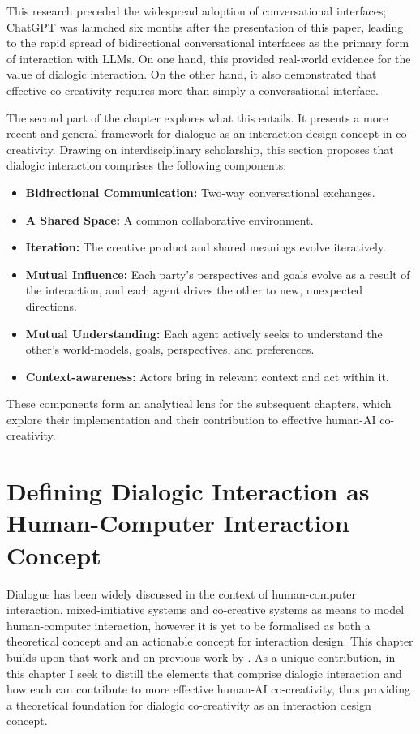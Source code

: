This research preceded the widespread adoption of conversational interfaces; ChatGPT was launched six months after the presentation of this paper, leading to the rapid spread of bidirectional conversational interfaces as the primary form of interaction with LLMs. On one hand, this provided real-world evidence for the value of dialogic interaction. On the other hand, it also demonstrated that effective co-creativity requires more than simply a conversational interface.

The second part of the chapter explores what this entails. It presents a more recent and general framework for dialogue as an interaction design concept in co-creativity. Drawing on interdisciplinary scholarship, this section proposes that dialogic interaction comprises the following components:

\begin{itemize}
\item \textbf{Bidirectional Communication:} Two-way conversational exchanges.
\item \textbf{A Shared Space:} A common collaborative environment.
\item \textbf{Iteration:} The creative product and shared meanings evolve iteratively.
\item \textbf{Mutual Influence:} Each party’s perspectives and goals evolve as a result of the interaction, and each agent drives the other to new, unexpected directions.
\item \textbf{Mutual Understanding:} Each agent actively seeks to understand the other's world-models, goals, perspectives, and preferences.
\item \textbf{Context-awareness:} Actors bring in relevant context and act within it.
\end{itemize}

These components form an analytical lens for the subsequent chapters, which explore their implementation and their contribution to effective human-AI co-creativity.





\section{Defining Dialogic Interaction as Human-Computer Interaction Concept}

Dialogue has been widely discussed in the context of human-computer interaction, mixed-initiative systems and co-creative systems \cite{Allen1999-sr, Yannakakis2014-zs, Deterding2017-wh} as means to model human-computer interaction, however it is yet to be formalised as both a theoretical concept and an actionable concept for interaction design. This chapter builds upon that work and on previous work by \cite{Bown2020-oc, Bown2024-yx}. As a unique contribution, in this chapter I seek to distill the elements that comprise dialogic interaction and how each can contribute to more effective human-AI co-creativity, thus providing a theoretical foundation for dialogic co-creativity as an interaction design concept. 

